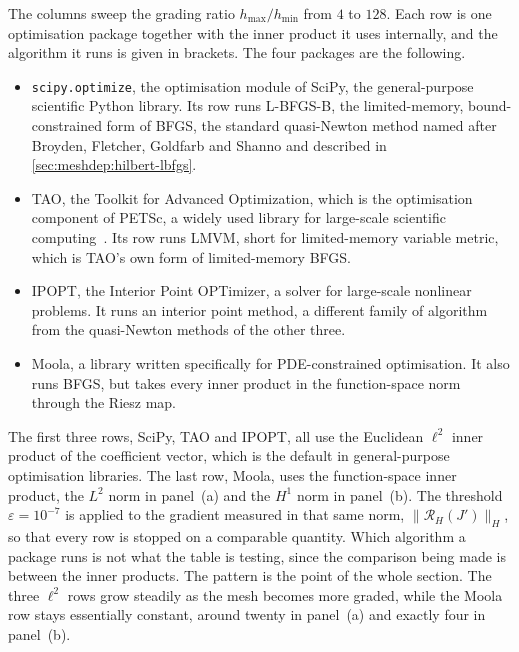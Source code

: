 \documentclass[a4paper,11pt]{article}
\newcommand{\Rmap}{\mathcal{R}}              %
\theoremstyle{spacedplain} \newtheorem{theorem}[counter]{Theorem} \newtheorem{lemma}[counter]{Lemma} \newtheorem{prop}[counter]{Proposition} \newtheorem{cor}[counter]{Corollary}
\theoremstyle{spaceddefinition} \newtheorem{defn}[counter]{Definition} \newtheorem{example}[counter]{Example} \newtheorem{remark}[counter]{Remark}
\begin{document}
The columns sweep the grading ratio $h_{\max}/h_{\min}$ from $4$ to $128$. Each row is one optimisation package together with the inner product it uses internally, and the algorithm it runs is given in brackets. The four packages are the following.

\begin{itemize}
  \item \texttt{scipy.optimize}, the optimisation module of SciPy, the general-purpose scientific Python library. Its row runs L-BFGS-B, the limited-memory, bound-constrained form of BFGS, the standard quasi-Newton method named after Broyden, Fletcher, Goldfarb and Shanno and described in \cref{sec:meshdep:hilbert-lbfgs}.
  \item TAO, the Toolkit for Advanced Optimization, which is the optimisation component of PETSc, a widely used library for large-scale scientific computing~\citep{petsc2024}. Its row runs LMVM, short for limited-memory variable metric, which is TAO's own form of limited-memory BFGS.
  \item IPOPT, the Interior Point OPTimizer, a solver for large-scale nonlinear problems. It runs an interior point method, a different family of algorithm from the quasi-Newton methods of the other three.
  \item Moola, a library written specifically for PDE-constrained optimisation. It also runs BFGS, but takes every inner product in the function-space norm through the Riesz map.
\end{itemize}

The first three rows, SciPy, TAO and IPOPT, all use the Euclidean $\ell^{2}$ inner product of the coefficient vector, which is the default in general-purpose optimisation libraries. The last row, Moola, uses the function-space inner product, the $L^{2}$ norm in panel~(a) and the $H^{1}$ norm in panel~(b). The threshold $\varepsilon = 10^{-7}$ is applied to the gradient measured in that same norm, $\|\Rmap_H(J')\|_H$, so that every row is stopped on a comparable quantity. Which algorithm a package runs is not what the table is testing, since the comparison being made is between the inner products. The pattern is the point of the whole section. The three $\ell^{2}$ rows grow steadily as the mesh becomes more graded, while the Moola row stays essentially constant, around twenty in panel~(a) and exactly four in panel~(b).
\end{document}
